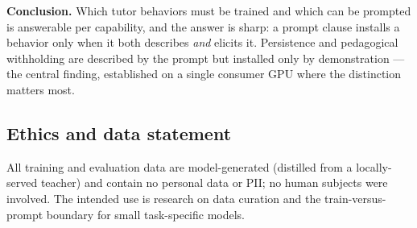 \textbf{Conclusion.} Which tutor behaviors must be trained and which can
be prompted is answerable per capability, and the answer is sharp: a
prompt clause installs a behavior only when it both describes \emph{and}
elicits it. Persistence and pedagogical withholding are described by the
prompt but installed only by demonstration --- the central finding,
established on a single consumer GPU where the distinction matters most.

\subsection{Ethics and data statement}\label{ethics-and-data-statement}

All training and evaluation data are model-generated (distilled from a
locally-served teacher) and contain no personal data or PII; no human
subjects were involved. The intended use is research on data curation
and the train-versus-prompt boundary for small task-specific models.
